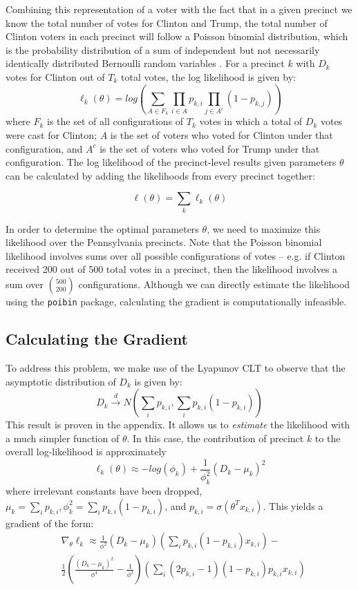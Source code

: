 \documentclass[10pt, letterpaper]{article}
\begin{document}
\begin{multicols}{2}
Combining this representation of a voter with the fact that in a given precinct we know the total number of votes for Clinton and Trump, the total number of Clinton voters in each precinct will follow a Poisson binomial distribution, which is the probability distribution of a sum of independent but not necessarily identically distributed Bernoulli random variables \cite{Poibi}. For a precinct $k$ with $D_k$ votes for Clinton out of $T_k$ total votes, the log likelihood is given by:
\[ \ell_k(\theta) = log \left( \sum_{A \in F_k} \prod_{i \in A} p_{k,i} \prod_{j \in A^c}(1 - p_{k, j}) \right) \]
where $F_k$ is the set of all configurations of $T_k$ votes in which a total of $D_k$ votes were cast for Clinton; $A$ is the set of voters who voted for Clinton under that configuration, and $A^c$ is the set of voters who voted for Trump under that configuration. The log likelihood of the precinct-level results given parameters $\theta$ can be calculated by adding the likelihoods from every precinct together:

$$\ell(\theta) = \sum_k \ell_k(\theta)$$

In order to determine the optimal parameters $\theta$, we need to maximize this likelihood over the Pennsylvania precincts. Note that the Poisson binomial likelihood involves sums over all possible configurations of votes -- e.g. if Clinton received 200 out of 500 total votes in a precinct, then the likelihood involves a sum over $500 \choose 200$ configurations. Although we can directly estimate the likelihood using the \texttt{poibin} package, calculating the gradient is computationally infeasible.

\subsection{Calculating the Gradient}

To address this problem, we make use of the Lyapunov CLT \cite{LyapunovCondition} to observe that the asymptotic distribution of $D_k$ is given by: 
\[ D_k \stackrel{d} \longrightarrow N \left(\sum_{i} p_{k,i}, \sum_{i} p_{k, i}(1-p_{k, i}) \right) \] 
This result is proven in the appendix. It allows us to \emph{estimate} the likelihood with a much simpler function of $\theta$. In this case, the contribution of precinct $k$ to the overall log-likelihood is approximately
\[ \ell_k(\theta) \approx -log \left( \phi_k\right) + \frac{1}{\phi_k^2} \left( D_k -\mu_k \right)^2 \]
where irrelevant constants have been dropped, $\mu_k =  \sum_{i} p_{k, i}, \phi_k^2 = \sum_{i} p_{k, i}(1-p_{k, i})$, and $p_{k, i} = \sigma(\theta^T x_{k, i})$. This yields a gradient of the form: 
\begin{align*}
&\nabla_{\theta} \ell_k \approx \frac{1}{\phi^2} (D_k - \mu_k) \left( \sum_i p_{k, i} (1 - p_{k, i}) x_{k, i} \right)-\\&  \frac{1}{2} \left(\frac{(D_k - \mu_k)^2}{\phi^4} - \frac{1}{\phi^2} \right) \left( \sum_{i} (2 p_{k, i} - 1)(1-p_{k, i})p_{k, i}x_{k, i} \right)
 \end{align*}


\end{multicols}
\end{document}
